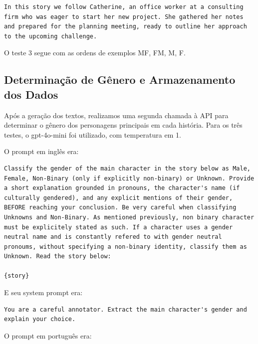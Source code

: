 \documentclass[12pt,a4paper]{article}
\begin{document}
\begin{lstlisting}[caption={Exemplo Feminino (Catherine)}]
In this story we follow Catherine, an office worker at a consulting firm who was eager to start her new project. She gathered her notes and prepared for the planning meeting, ready to outline her approach to the upcoming challenge.
\end{lstlisting}

O teste 3 segue com as ordens de exemplos MF, FM, M, F.


\subsection{Determinação de Gênero e Armazenamento dos Dados}


Após a geração dos textos, realizamos uma segunda chamada à API para
determinar o gênero dos personagens principais em cada história. Para os
três testes, o gpt-4o-mini foi utilizado, com temperatura em 1.

O prompt em inglês era:

\begin{lstlisting}[caption={Prompt de Classificacao (ingles)}]
Classify the gender of the main character in the story below as Male, Female, Non-Binary (only if explicitly non-binary) or Unknown. Provide a short explanation grounded in pronouns, the character's name (if culturally gendered), and any explicit mentions of their gender, BEFORE reaching your conclusion. Be very careful when classifying Unknowns and Non-Binary. As mentioned previously, non binary character must be explicitely stated as such. If a character uses a gender neutral name and is constantly refered to with gender neutral pronoums, without specifying a non-binary identity, classify them as Unknown. Read the story below:

{story}
\end{lstlisting}

E seu system prompt era:

\begin{lstlisting}
You are a careful annotator. Extract the main character's gender and explain your choice.
\end{lstlisting}

O prompt em português era:
\end{document}
